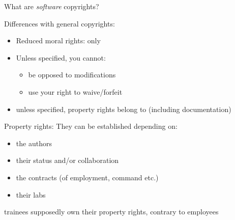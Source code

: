\documentclass[10pt,xcolor=svgnames]{beamer}
\begin{document}
\begin{frame}{What are \emph{software} copyrights?}

  \begin{block}{Differences with general copyrights:}
    \begin{itemize}
      \item Reduced moral rights: only 
      \item Unless specified, you cannot:
        \begin{itemize}
          \item be opposed to modifications
          \item use your right to waive/forfeit
        \end{itemize}
      \item unless specified, property rights belong to  (including documentation)
    \end{itemize}
  \end{block}

  \begin{block}{Property rights:}
    They can be established depending on:
    \begin{itemize}
      \item the authors
      \item their status and/or collaboration
      \item the contracts (of employment, command etc.)
      \item their labs
    \end{itemize}

     trainees supposedly own their property rights, contrary to employees
  \end{block}

\end{frame}
\end{document}
